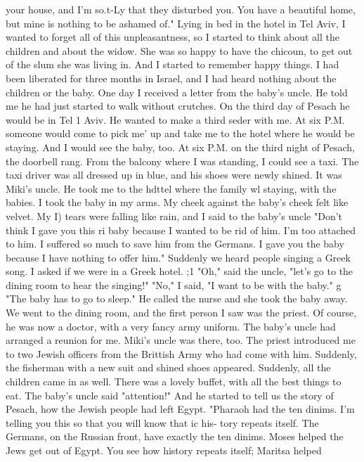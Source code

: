 {your house, and I'm so.t-Ly that they disturbed you. You have a beautiful home, but mine 
is nothing to be ashamed of." 
Lying in bed in the hotel in Tel Aviv, I wanted to forget all of this unpleasantness, 
so I started to think about all the children and about the widow. She was so happy to 
have the chicoun, to get out of the slum she was living in. And I started to remember 
happy things. 
I had been liberated for three months in Israel, and I had heard nothing about the 
children or the baby. One day I received a letter from the baby's uncle. He told me he 
had just started to walk without crutches. On the third day of Pesach he would be in Tel 1 
Aviv. He wanted to make a third seder with me. At six P.M. someone would come to pick me' 
up and take me to the hotel where he would be staying. And I would see the baby, too. 
At six P.M. on the third night of Pesach, the doorbell rang. From the balcony where 
I was standing, I could see a taxi. The taxi driver was all dressed up in blue, and his 
shoes were newly shined. It was Miki's uncle. He took me to the hdttel where the family wl 
staying, with the babies. 
I took the baby in my arms. My cheek against the baby's cheek felt like velvet. My 
I) 
tears were falling like rain, and I said to the baby's uncle "Don't think I gave you this ri 
baby because I wanted to be rid of him. I'm too attached to him. I suffered so much to 
save him from the Germans. I gave you the baby because I have nothing to offer him." 
Suddenly we heard people singing a Greek song. I asked if we were in a Greek hotel. ;1 
"Oh," said the uncle, "let's go to the dining room to hear the singing!" "No," I said, 
"I want to be with the baby." g "The baby has to go to sleep." He called the nurse and 
she took the baby away. 
We went to the dining room, and the first person I saw was the priest. Of course, he 
was now a doctor, with a very fancy army uniform. The baby's uncle had arranged a reunion 
for me. Miki's uncle was there, too. The priest introduced me to two Jewish officers 
from the Brittish Army who had come with him. Suddenly, the fisherman with a new suit 
and shined shoes appeared. Suddenly, all the children came in as well. 
There was a lovely buffet, with all the best things to eat. The baby's uncle said 
"attention!" And he started to tell us the story of Pesach, how the Jewish people had 
left Egypt. 
"Pharaoh had the ten dinims. I'm telling you this so that you will know that ic his-
tory repeats itself. The Germans, on the Russian front, have exactly the ten dinims. 
Moses helped the Jews get out of Egypt. You see how history repeats itself; Maritsa helped 
}
